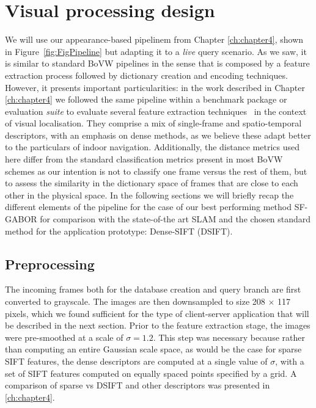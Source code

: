\section{Visual processing design}
\label{sec:visualproc}
We will use our appearance-based pipelinem from Chapter \ref{ch:chapter4}, shown in Figure~\ref{fig:FigPipeline} but adapting it to a \emph{live} query scenario. As we saw, it is similar to standard BoVW pipelines in the sense that is composed by a feature extraction process followed by dictionary creation and encoding techniques. However, it presents important particularities: in the work described in Chapter \ref{ch:chapter4} we followed the same pipeline within a benchmark package or evaluation \emph{suite} to evaluate several feature extraction techniques~\citep{Rivera-Rubio2015PRL} in the context of visual localisation. They comprise a mix of single-frame and spatio-temporal descriptors, with an emphasis on dense methods, as we believe these adapt better to the particulars of indoor navigation. Additionally, the distance metrics used here differ from the standard classification metrics present in most BoVW schemes as our intention is not to classify one frame versus the rest of them, but to assess the similarity in the dictionary space of frames that are close to each other in the physical space. In the following sections we will briefly recap the different elements of the pipeline for the case of our best performing method SF-GABOR for comparison with the state-of-the art SLAM and the chosen standard method for the application prototype: Dense-SIFT (DSIFT).

\subsection{Preprocessing}

The incoming frames both for the database creation and query branch are first converted to grayscale. The images are then downsampled to size 208 $\times$ 117 pixels, which we found sufficient for the type of client-server application that will be described in the next section. Prior to the feature extraction stage, the images were pre-smoothed at a scale of $\sigma = 1.2$. This step was necessary because rather than computing an entire Gaussian scale space, as would be the case for sparse SIFT features, the dense descriptors are computed at a single value of $\sigma$, with a set of SIFT features computed on equally spaced points specified by a grid. A comparison of sparse vs DSIFT and other descriptors was presented in \ref{ch:chapter4}.

